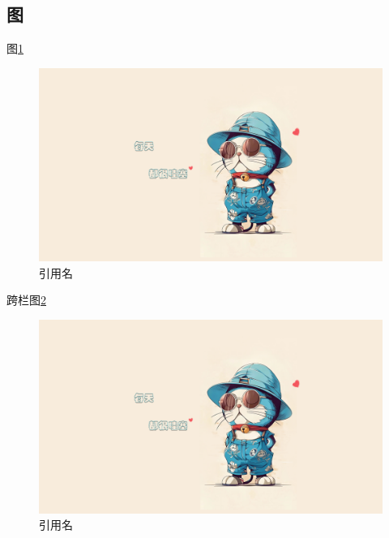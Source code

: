 \documentclass{template.cls} %
\begin{document}
\begin{multicols}{2}
\subsection{图}
图\ref{图注}
\begin{figure}[H]
    \centering
    \includegraphics[width=0.8\linewidth]{demo.jpg}
    \caption{引用名}
    \label{图注}
\end{figure}


\end{multicols}


跨栏图\ref{图注2}
\begin{figure}[H]
    \centering
    \includegraphics[width=0.8\linewidth]{demo.jpg}
    \caption{引用名}
    \label{图注2}
\end{figure}
\end{document}
